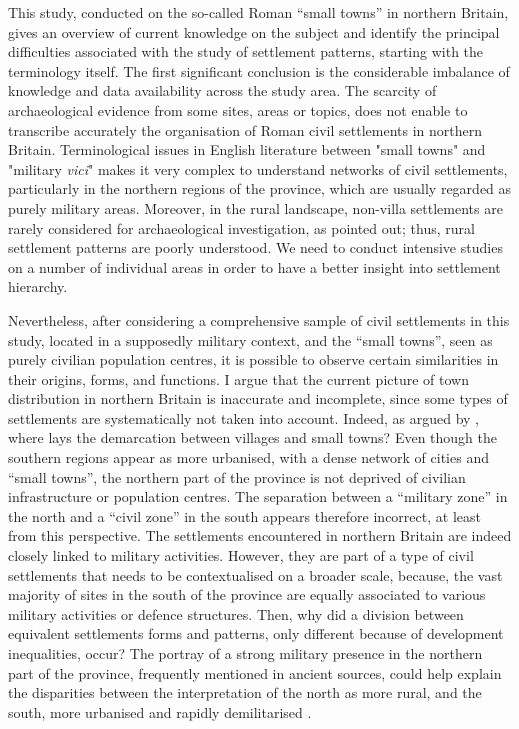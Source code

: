 This study, conducted on the so-called Roman “small towns” in northern Britain, gives an overview of current knowledge on the subject and identify the principal difficulties associated with the study of settlement patterns, starting with the terminology itself. The first significant conclusion is the considerable imbalance of knowledge and data availability across the study area. The scarcity of archaeological evidence from some sites, areas or topics, does not enable to transcribe accurately the organisation of Roman civil settlements in northern Britain. Terminological issues in English literature between "small towns" and "military \emph{vici}" makes it very complex to understand networks of civil settlements, particularly in the northern regions of the province, which are usually regarded as purely military areas. Moreover, in the rural landscape, non-villa settlements are rarely considered for archaeological investigation, as \textcite[76]{Hingley_1991} pointed out; thus, rural settlement patterns are poorly understood. We need to conduct intensive studies on a number of individual areas in order to have a better insight into settlement hierarchy.

Nevertheless, after considering a comprehensive sample of civil settlements in this study, located in a supposedly military context, and the “small towns”, seen as purely civilian population centres, it is possible to observe certain similarities in their origins, forms, and functions. I argue that the current picture of town distribution in northern Britain is inaccurate and incomplete, since some types of settlements are systematically not taken into account. Indeed, as argued by \textcite[76]{Jones_1991}, where lays the demarcation between villages and small towns? Even though the southern regions appear as more urbanised, with a dense network of cities and “small towns”, the northern part of the province is not deprived of civilian infrastructure or population centres. The separation between a “military zone” in the north and a “civil zone” in the south appears therefore incorrect, at least from this perspective. The settlements encountered in northern Britain are indeed closely linked to military activities. However, they are part of a type of civil settlements that needs to be contextualised on a broader scale, because, the vast majority of sites in the south of the province are equally associated to various military activities or defence structures. Then, why did a division between equivalent settlements forms and patterns, only different because of development inequalities, occur? The portray of a strong military presence in the northern part of the province, frequently mentioned in ancient sources, could help explain the disparities between the interpretation of the north as more rural, and the south, more urbanised and rapidly demilitarised \parencite[291]{Mattingly_2006}.

